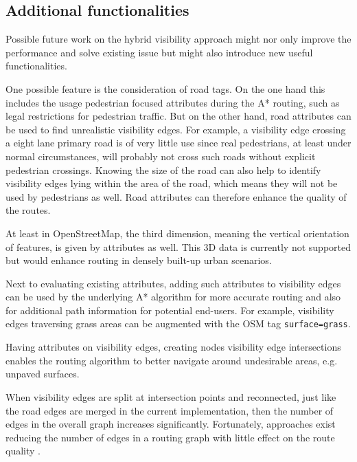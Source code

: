 	\subsection{Additional functionalities}
		
		Possible future work on the hybrid visibility approach might nor only improve the performance and solve existing issue but might also introduce new useful functionalities.
		
		One possible feature is the consideration of road tags.
		On the one hand this includes the usage pedestrian focused attributes during the A* routing, such as legal restrictions for pedestrian traffic.
		But on the other hand, road attributes can be used to find unrealistic visibility edges.
		For example, a visibility edge crossing a eight lane primary road is of very little use since real pedestrians, at least under normal circumstances, will probably not cross such roads without explicit pedestrian crossings.
		Knowing the size of the road can also help to identify visibility edges lying within the area of the road, which means they will not be used by pedestrians as well.
		Road attributes can therefore enhance the quality of the routes.
		
		At least in OpenStreetMap, the third dimension, meaning the vertical orientation of features, is given by attributes as well.
		This 3D data is currently not supported but would enhance routing in densely built-up urban scenarios.
		
		Next to evaluating existing attributes, adding such attributes to visibility edges can be used by the underlying A* algorithm for more accurate routing and also for additional path information for potential end-users.
		For example, visibility edges traversing grass areas can be augmented with the OSM tag \texttt{surface=grass}.
		
		Having attributes on visibility edges, creating nodes visibility edge intersections enables the routing algorithm to better navigate around undesirable areas, e.g. unpaved surfaces.
		
		When visibility edges are split at intersection points and reconnected, just like the road edges are merged in the current implementation, then the number of edges in the overall graph increases significantly.
		Fortunately, approaches exist reducing the number of edges in a routing graph with little effect on the route quality \cite{aumann-reducing-routing-graph}.
		

